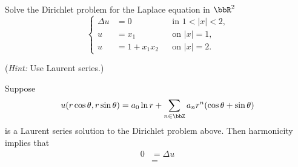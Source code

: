 \begin{problem}
  Solve the Dirichlet problem for the Laplace equation in \(\bbR^2\)
  \[
    \left\{
      \begin{aligned}
        \Delta u&=0&&\text{in \(1<|x|<2\),}\\
        u&=x_1&&\text{on \(|x|=1\),}\\
        u&=1+x_1x_2&&\text{on \(|x|=2\).}
      \end{aligned}
    \right.
  \]

  \noindent (\emph{Hint:} Use Laurent series.)
\end{problem}
\begin{solution}
  Suppose
  \begin{equation}
    \label{eq:7:laurent-series-solution}
    u(r\cos\theta,r\sin\theta)=
    a_0\ln r+\sum_{n\in\bbZ} a_nr^n(\cos\theta+\sin\theta)
  \end{equation}
  is a Laurent series solution to the Dirichlet problem above. Then
  harmonicity implies that
  \begin{align*}
    0&=\Delta u\\
     &=
  \end{align*}
\end{solution}
\newpage

